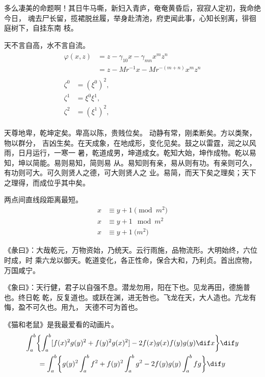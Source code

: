 \documentclass[../Main/thesis.tex]{subfiles}
\begin{document}
多么凄美的命题啊！其日牛马嘶，新妇入青庐，奄奄黄昏后，寂寂人定初，我命绝今日，
魂去尸长留，揽裙脱丝履，举身赴清池，府吏闻此事，心知长别离，徘徊庭树下，自挂东南
枝。

\begin{remark}
  天不言自高，水不言自流。
  \begin{gather*}
    \begin{split}
      \varphi(x,z)
      &=z-\gamma_{10}x-\gamma_{mn}x^mz^n\\
      &=z-Mr^{-1}x-Mr^{-(m+n)}x^mz^n
    \end{split}\\[6pt]
    \begin{align} \zeta^0 & =(\xi^0)^2,  \\
      \zeta^1 & =\xi^0\xi^1, \\
      \zeta^2 & =(\xi^1)^2,
    \end{align}
  \end{gather*}
\end{remark}

天尊地卑，乾坤定矣。卑高以陈，贵贱位矣。 动静有常，刚柔断矣。方以类聚，物以群分，
吉凶生矣。在天成象，在地成形，变化见矣。鼓之以雷霆，润之以风雨，日月运行，一寒一
暑，乾道成男，坤道成女。乾知大始，坤作成物。乾以易知，坤以简能。易则易知，简则易
从。易知则有亲，易从则有功。有亲则可久，有功则可大。可久则贤人之德，可大则贤人之
业。易简，而天下矣之理矣；天下之理得，而成位乎其中矣。

\begin{axiom}
  两点间直线段距离最短。
  \begin{align}
    x & \equiv y+1\pmod{m^2} \\
    x & \equiv y+1\mod{m^2}  \\
    x & \equiv y+1\pod{m^2}
  \end{align}
\end{axiom}

《彖曰》：大哉乾元，万物资始，乃统天。云行雨施，品物流形。大明始终，六位时成，时
乘六龙以御天。乾道变化，各正性命，保合大和，乃利贞。首出庶物，万国咸宁。

《象曰》：天行健，君子以自强不息。潜龙勿用，阳在下也。见龙再田，德施普也。终日乾
乾，反复道也。或跃在渊，进无咎也。飞龙在天，大人造也。亢龙有悔，盈不可久也。用九，
天德不可为首也。

\begin{lemma}
  《猫和老鼠》是我最爱看的动画片。
  \begin{multline*}%
    \int_a^b\biggl\{\int_a^b[f(x)^2g(y)^2+f(y)^2g(x)^2]
    -2f(x)g(x)f(y)g(y)\dif x\biggr\}\dif y \\
    =\int_a^b\biggl\{g(y)^2\int_a^bf^2+f(y)^2
    \int_a^b g^2-2f(y)g(y)\int_a^b fg\biggr\}\dif y
  \end{multline*}
\end{lemma}
\end{document}
